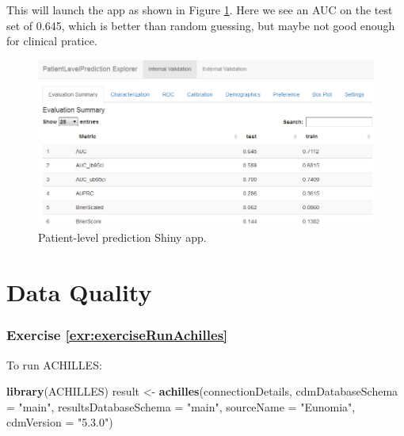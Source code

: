 \documentclass[11pt]{book}
\newenvironment{Shaded}{\begin{snugshade}}{\end{snugshade}}
\newcommand{\DataTypeTok}[1]{\textcolor[rgb]{0.13,0.29,0.53}{#1}}
\newcommand{\KeywordTok}[1]{\textcolor[rgb]{0.13,0.29,0.53}{\textbf{#1}}}
\newcommand{\NormalTok}[1]{#1}
\newcommand{\StringTok}[1]{\textcolor[rgb]{0.31,0.60,0.02}{#1}}
\theoremstyle{definition}
\theoremstyle{definition}
\theoremstyle{definition}
\theoremstyle{remark}
\begin{document}
This will launch the app as shown in Figure \ref{fig:plpShiny}. Here we see an AUC on the test set of 0.645, which is better than random guessing, but maybe not good enough for clinical pratice.

\begin{figure}

{\centering \includegraphics[width=1\linewidth]{images/SuggestedAnswers/plpShiny} 

}

\caption{Patient-level prediction Shiny app.}\label{fig:plpShiny}
\end{figure}

\hypertarget{DataQualityanswers}{%
\section{Data Quality}\label{DataQualityanswers}}

\hypertarget{exercise-refexrexerciserunachilles}{%
\subsubsection*{Exercise \ref{exr:exerciseRunAchilles}}\label{exercise-refexrexerciserunachilles}}

To run ACHILLES:

\begin{Shaded}
\begin{Highlighting}[]
\KeywordTok{library}\NormalTok{(ACHILLES)}
\NormalTok{result <-}\StringTok{ }\KeywordTok{achilles}\NormalTok{(connectionDetails,}
                   \DataTypeTok{cdmDatabaseSchema =} \StringTok{"main"}\NormalTok{,}
                   \DataTypeTok{resultsDatabaseSchema =} \StringTok{"main"}\NormalTok{,}
                   \DataTypeTok{sourceName =} \StringTok{"Eunomia"}\NormalTok{,}
                   \DataTypeTok{cdmVersion =} \StringTok{"5.3.0"}\NormalTok{)}
\end{Highlighting}
\end{Shaded}
\end{document}
